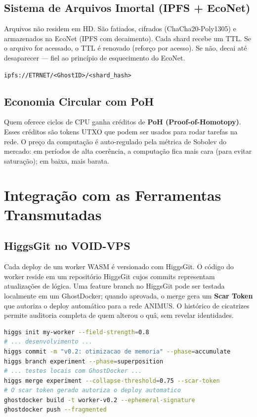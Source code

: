 \documentclass[12pt,a4paper,twoside]{book}
\theoremstyle{remark}
\begin{document}
\subsection{Sistema de Arquivos Imortal (IPFS + EcoNet)}

Arquivos n\~{a}o residem em HD. S\~{a}o fatiados, cifrados (ChaCha20-Poly1305) e armazenados na EcoNet (IPFS com decaimento). Cada shard recebe um TTL. Se o arquivo for acessado, o TTL \'e renovado (refor\c{c}o por acesso). Se n\~{a}o, decai at\'e desaparecer — fiel ao princ\'ipio de esquecimento do EcoNet.

\begin{center}
\texttt{ipfs://ETRNET/<GhostID>/<shard\_hash>}
\end{center}

\subsection{Economia Circular com PoH}

Quem oferece ciclos de CPU ganha cr\'editos de \textbf{PoH (Proof-of-Homotopy)}. Esses cr\'editos s\~{a}o tokens UTXO que podem ser usados para rodar tarefas na rede. O pre\c{c}o da computa\c{c}\~{a}o \'e auto-regulado pela m\'etrica de Sobolev do mercado: em per\'iodos de alta coer\^encia, a computa\c{c}\~{a}o fica mais cara (para evitar satura\c{c}\~{a}o); em baixa, mais barata.

\section{Integra\c{c}\~{a}o com as Ferramentas Transmutadas}

\subsection{HiggsGit no VOID-VPS}

Cada deploy de um worker WASM \'e versionado com HiggsGit. O c\'odigo do worker reside em um reposit\'orio HiggsGit cujos commits representam atualiza\c{c}\~{o}es de l\'ogica. Uma feature branch no HiggsGit pode ser testada localmente em um GhostDocker; quando aprovada, o merge gera um \textbf{Scar Token} que autoriza o deploy autom\'atico para a rede ANIMUS. O hist\'orico de cicatrizes permite auditoria completa de quem alterou o qu\^a, sem revelar identidades.

\begin{lstlisting}[language=bash, caption=Deploy de um Worker com HiggsGit]
higgs init my-worker --field-strength=0.8
# ... desenvolvimento ...
higgs commit -m "v0.2: otimizacao de memoria" --phase=accumulate
higgs branch experiment --phase=superposition
# ... testes locais com GhostDocker ...
higgs merge experiment --collapse-threshold=0.75 --scar-token
# O scar token gerado autoriza o deploy automatico
ghostdocker build -t worker-v0.2 --ephemeral-signature
ghostdocker push --fragmented
\end{lstlisting}
\end{document}
